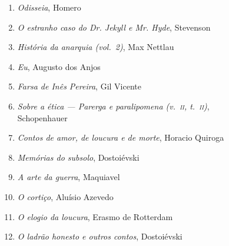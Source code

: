 \begin{enumerate}
\item \textit{Odisseia}, Homero
\item \textit{O estranho caso do Dr. Jekyll e Mr. Hyde}, Stevenson
\item \textit{História da anarquia (vol.~2)}, Max Nettlau
\item \textit{Eu}, Augusto dos Anjos
\item \textit{Farsa de Inês Pereira}, Gil Vicente
\item \textit{Sobre a ética --- Parerga e paralipomena (v.~\textsc{ii}, t.~\textsc{ii})},\\ Schopenhauer 
\item \textit{Contos de amor, de loucura e de morte}, Horacio Quiroga
\item \textit{Memórias do subsolo}, Dostoiévski
\item \textit{A arte da guerra}, Maquiavel
\item \textit{O cortiço}, Aluísio Azevedo
\item \textit{O elogio da loucura}, Erasmo de Rotterdam
\item \textit{O ladrão honesto e outros contos}, Dostoiévski
\vfill
\end{enumerate}
\endgroup

\pagebreak
\ifodd\thepage\paginabranca\else\clearpage\fi

